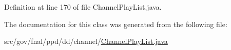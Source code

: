 Definition at line 170 of file Channel\-Play\-List.\-java.



The documentation for this class was generated from the following file\-:\begin{DoxyCompactItemize}
\item 
src/gov/fnal/ppd/dd/channel/\hyperlink{ChannelPlayList_8java}{Channel\-Play\-List.\-java}\end{DoxyCompactItemize}
